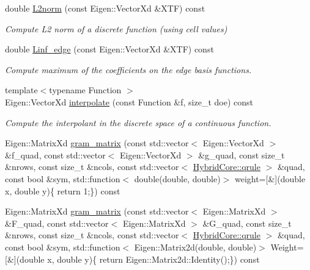 \begin{DoxyCompactItemize}
double \hyperlink{classHArDCore2D_1_1HybridCore_a4571fff91492781ebb01849b1063e626}{L2norm} (const Eigen\+::\+Vector\+Xd \&X\+TF) const
\begin{DoxyCompactList}\small\item\em Compute L2 norm of a discrete function (using cell values) \end{DoxyCompactList}\item 
\mbox{\label{classHArDCore2D_1_1HybridCore_a881165aafe7583d9ba7c8c2dfa0de758}} 
double \hyperlink{classHArDCore2D_1_1HybridCore_a881165aafe7583d9ba7c8c2dfa0de758}{Linf\+\_\+edge} (const Eigen\+::\+Vector\+Xd \&X\+TF) const
\begin{DoxyCompactList}\small\item\em Compute maximum of the coefficients on the edge basis functions. \end{DoxyCompactList}\item 
{\footnotesize template$<$typename Function $>$ }\\Eigen\+::\+Vector\+Xd \hyperlink{group__HybridCore2D_ga71c953efc96f467cb24faa1b60ee9bb2}{interpolate} (const Function \&f, size\+\_\+t doe) const
\begin{DoxyCompactList}\small\item\em Compute the interpolant in the discrete space of a continuous function. \end{DoxyCompactList}\item 
Eigen\+::\+Matrix\+Xd \hyperlink{classHArDCore2D_1_1HybridCore_a0f34d7feff2d992c1004d1c67a660320}{gram\+\_\+matrix} (const std\+::vector$<$ Eigen\+::\+Vector\+Xd $>$ \&f\+\_\+quad, const std\+::vector$<$ Eigen\+::\+Vector\+Xd $>$ \&g\+\_\+quad, const size\+\_\+t \&nrows, const size\+\_\+t \&ncols, const std\+::vector$<$ \hyperlink{structHArDCore2D_1_1HybridCore_1_1qrule}{Hybrid\+Core\+::qrule} $>$ \&quad, const bool \&sym, std\+::function$<$ double(double, double)$>$ weight=\mbox{[}\&\mbox{]}(double x, double y)\{ return 1;\}) const
\item 
Eigen\+::\+Matrix\+Xd \hyperlink{classHArDCore2D_1_1HybridCore_a633814c5b4f35034d04b74f09802303d}{gram\+\_\+matrix} (const std\+::vector$<$ Eigen\+::\+Matrix\+Xd $>$ \&F\+\_\+quad, const std\+::vector$<$ Eigen\+::\+Matrix\+Xd $>$ \&G\+\_\+quad, const size\+\_\+t \&nrows, const size\+\_\+t \&ncols, const std\+::vector$<$ \hyperlink{structHArDCore2D_1_1HybridCore_1_1qrule}{Hybrid\+Core\+::qrule} $>$ \&quad, const bool \&sym, std\+::function$<$ Eigen\+::\+Matrix2d(double, double)$>$ Weight=\mbox{[}\&\mbox{]}(double x, double y)\{ return Eigen\+::\+Matrix2d\+::\+Identity();\}) const

\end{DoxyCompactItemize}
